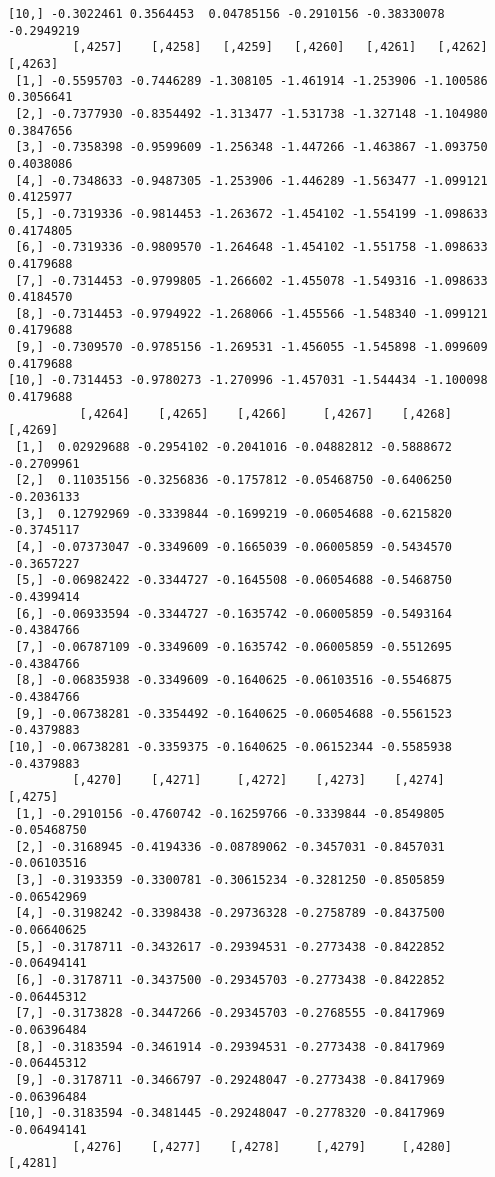 \documentclass[
  letterpaper,
  DIV=11,
  numbers=noendperiod]{scrreprt}
\begin{document}
\begin{verbatim}
[10,] -0.3022461 0.3564453  0.04785156 -0.2910156 -0.38330078 -0.2949219
         [,4257]    [,4258]   [,4259]   [,4260]   [,4261]   [,4262]   [,4263]
 [1,] -0.5595703 -0.7446289 -1.308105 -1.461914 -1.253906 -1.100586 0.3056641
 [2,] -0.7377930 -0.8354492 -1.313477 -1.531738 -1.327148 -1.104980 0.3847656
 [3,] -0.7358398 -0.9599609 -1.256348 -1.447266 -1.463867 -1.093750 0.4038086
 [4,] -0.7348633 -0.9487305 -1.253906 -1.446289 -1.563477 -1.099121 0.4125977
 [5,] -0.7319336 -0.9814453 -1.263672 -1.454102 -1.554199 -1.098633 0.4174805
 [6,] -0.7319336 -0.9809570 -1.264648 -1.454102 -1.551758 -1.098633 0.4179688
 [7,] -0.7314453 -0.9799805 -1.266602 -1.455078 -1.549316 -1.098633 0.4184570
 [8,] -0.7314453 -0.9794922 -1.268066 -1.455566 -1.548340 -1.099121 0.4179688
 [9,] -0.7309570 -0.9785156 -1.269531 -1.456055 -1.545898 -1.099609 0.4179688
[10,] -0.7314453 -0.9780273 -1.270996 -1.457031 -1.544434 -1.100098 0.4179688
          [,4264]    [,4265]    [,4266]     [,4267]    [,4268]    [,4269]
 [1,]  0.02929688 -0.2954102 -0.2041016 -0.04882812 -0.5888672 -0.2709961
 [2,]  0.11035156 -0.3256836 -0.1757812 -0.05468750 -0.6406250 -0.2036133
 [3,]  0.12792969 -0.3339844 -0.1699219 -0.06054688 -0.6215820 -0.3745117
 [4,] -0.07373047 -0.3349609 -0.1665039 -0.06005859 -0.5434570 -0.3657227
 [5,] -0.06982422 -0.3344727 -0.1645508 -0.06054688 -0.5468750 -0.4399414
 [6,] -0.06933594 -0.3344727 -0.1635742 -0.06005859 -0.5493164 -0.4384766
 [7,] -0.06787109 -0.3349609 -0.1635742 -0.06005859 -0.5512695 -0.4384766
 [8,] -0.06835938 -0.3349609 -0.1640625 -0.06103516 -0.5546875 -0.4384766
 [9,] -0.06738281 -0.3354492 -0.1640625 -0.06054688 -0.5561523 -0.4379883
[10,] -0.06738281 -0.3359375 -0.1640625 -0.06152344 -0.5585938 -0.4379883
         [,4270]    [,4271]     [,4272]    [,4273]    [,4274]     [,4275]
 [1,] -0.2910156 -0.4760742 -0.16259766 -0.3339844 -0.8549805 -0.05468750
 [2,] -0.3168945 -0.4194336 -0.08789062 -0.3457031 -0.8457031 -0.06103516
 [3,] -0.3193359 -0.3300781 -0.30615234 -0.3281250 -0.8505859 -0.06542969
 [4,] -0.3198242 -0.3398438 -0.29736328 -0.2758789 -0.8437500 -0.06640625
 [5,] -0.3178711 -0.3432617 -0.29394531 -0.2773438 -0.8422852 -0.06494141
 [6,] -0.3178711 -0.3437500 -0.29345703 -0.2773438 -0.8422852 -0.06445312
 [7,] -0.3173828 -0.3447266 -0.29345703 -0.2768555 -0.8417969 -0.06396484
 [8,] -0.3183594 -0.3461914 -0.29394531 -0.2773438 -0.8417969 -0.06445312
 [9,] -0.3178711 -0.3466797 -0.29248047 -0.2773438 -0.8417969 -0.06396484
[10,] -0.3183594 -0.3481445 -0.29248047 -0.2778320 -0.8417969 -0.06494141
         [,4276]    [,4277]    [,4278]     [,4279]     [,4280]    [,4281]

\end{verbatim}
\end{document}
